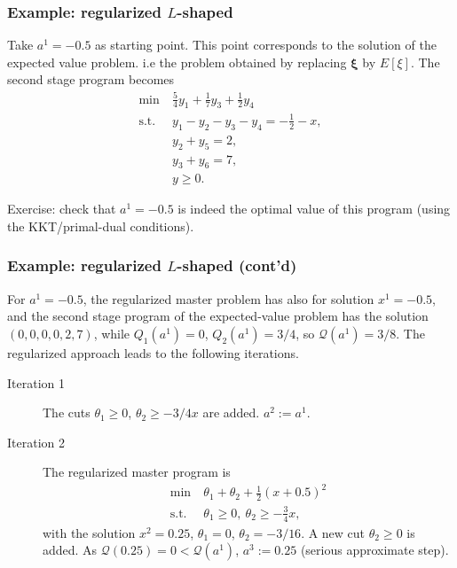 \documentclass{beamer}
\def\bxi{\boldsymbol\xi}
\def\bxi{\boldsymbol\xi}
\begin{document}
\begin{frame}
\frametitle{Example: regularized $L$-shaped}

Take $a^1 = -0.5$ as starting point.
This point corresponds to the solution of the expected value problem. i.e the problem obtained by replacing $\bxi$ by $E[\xi]$.
The second stage program becomes
\begin{align*}
\min\ & \frac{5}{4}y_1 + \frac{1}{7}y_3 + \frac{1}{2}y_4\\
\mbox{s.t. } & y_1 - y_2 - y_3 - y_4 = -\frac{1}{2}-x, \\
& y_2+y_5 = 2, \\
& y_3+y_6 = 7, \\
& y \geq 0.
\end{align*}

\mbox{}

\mbox{}

{\blue Exercise}: check that $a^1 = -0.5$ is indeed the optimal value of this program (using the KKT/primal-dual conditions).
\end{frame}

\begin{frame}
\frametitle{Example: regularized $L$-shaped (cont'd)}

For $a^1 = -0.5$, the regularized master problem has also for solution $x^1 = -0.5$, and the second stage program of the expected-value problem has the solution $(0,0,0,0,2,7)$, while $Q_1(a^1) = 0$, $Q_2(a^1) = 3/4$, so $\mathcal{Q}(a^1) = 3/8$.
The regularized approach leads to the following iterations.
\begin{description}
\item[Iteration 1] The cuts $\theta_1 \geq 0$, $\theta_2 \geq -3/4
x$ are added. $a^2:= a^1$.
\item[Iteration 2]
The regularized master program is
\begin{align*}
\min\ & \theta_1 + \theta_2 + \frac{1}{2}(x+0.5)^2 \\
\mbox{s.t. } & \theta_1 \geq 0,\ \theta_2 \geq -\frac{3}{4}x,
\end{align*}
with the solution $x^2 = 0.25$, $\theta_1 = 0$, $\theta_2 = -3/16$.
A new cut $\theta_2 \geq 0$ is added.
As $\mathcal{Q}(0.25) = 0 < \mathcal{Q}(a^1)$, $a^3 := 0.25$ (serious approximate step).
\end{description}
\end{frame}
\end{document}
